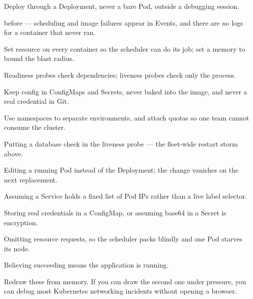 \begin{bestpractices}
\begin{wbitem}
  \item Deploy through a Deployment, never a bare Pod, outside a debugging session.
  \item {} before  --- scheduling and image failures appear in Events, and there are no logs for a container that never ran.
  \item Set resource  on every container so the scheduler can do its job; set a memory  to bound the blast radius.
  \item Readiness probes check dependencies; liveness probes check only the process.
  \item Keep config in ConfigMaps and Secrets, never baked into the image, and never a real credential in Git.
  \item Use namespaces to separate environments, and attach quotas so one team cannot consume the cluster.
\end{wbitem}
\end{bestpractices}
\begin{mistakes}
\begin{wbitem}
  \item Putting a database check in the liveness probe --- the fleet-wide restart storm above.
  \item Editing a running Pod instead of the Deployment; the change vanishes on the next replacement.
  \item Assuming a Service holds a fixed list of Pod IPs rather than a live label selector.
  \item Storing real credentials in a ConfigMap, or assuming base64 in a Secret is encryption.
  \item Omitting resource requests, so the scheduler packs blindly and one Pod starves its node.
  \item Believing  succeeding means the application is running.
\end{wbitem}
\end{mistakes}


Redraw these from memory. If you can draw the second one under pressure, you can debug most Kubernetes networking incidents without opening a browser.

\begin{writespace}
\end{writespace}

